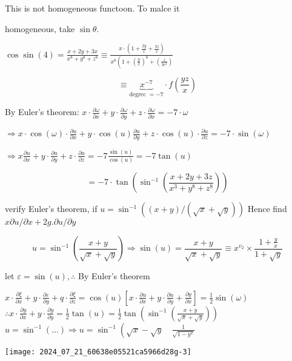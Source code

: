 \documentclass[12pt, a4paper]{article}
\begin{document}
This is not homogeneous functoon. To malce it

homogeneous, take $\sin \theta$.

$\cos \sin (4)=\frac{x+2 y+3 x}{x^{8}+y^{8}+z^{8}} \equiv \frac{x \cdot\left(1+\frac{2 y}{x}+\frac{3 z}{x}\right)}{x^{8}\left(1+\left(\frac{y}{x}\right)^{8}+\left(\frac{z}{3 c^{2}}\right)\right.}$

$$
\equiv \underbrace{x^{-7}}_{\text {degrec }=-7} \cdot f\left(\frac{y z}{x}\right)
$$

By Euler's theorem: $x \cdot \frac{\partial \omega}{\partial x}+y \cdot \frac{\partial \omega}{\partial y}+z \cdot \frac{\partial \omega}{\partial x}=-7 \cdot \omega$

$\Rightarrow x \cdot \cos (\omega) \cdot \frac{\partial u}{\partial x}+y \cdot \cos (u) \frac{\partial u}{\partial y}+z \cdot \cos (u) \cdot \frac{\partial u}{\partial z}=-7 \cdot \sin (\omega)$

$\Rightarrow x \frac{\partial u}{\partial x}+y \cdot \frac{\partial u}{\partial y}+z \cdot \frac{\partial u}{\partial z}=-7 \frac{\sin (u)}{\cos (u)}=-7 \tan (u)$

$$
=-7 \cdot \tan \left(\sin ^{-1}\left(\frac{x+2 y+3 z}{x^{3}+y^{8}+z^{8}}\right)\right)
$$

verify Euler's theorem, if $u=\sin ^{-1}((x+y) /(\sqrt{x}+\sqrt{y}))$ Hence find $x \partial u / \partial x+2 g . \partial u / \partial y$

$$
u=\sin ^{-1}\left(\frac{x+y}{\sqrt{x}+\sqrt{y}}\right) \Rightarrow \sin (u)=\frac{x+y}{\sqrt{x}+\sqrt{y}} \equiv x^{v_{2}} \times \frac{1+\frac{y}{x}}{1+\sqrt{y}}
$$

let $\varepsilon=\sin (u), \therefore$ By Euler's theorem

$x \cdot \frac{\partial \xi}{\partial x}+y \cdot \frac{\partial \varepsilon}{\partial y}+q \cdot \frac{\partial \xi}{\partial z}=\cos (u)\left[x \cdot \frac{\partial u}{\partial x}+y \cdot \frac{\partial u}{\partial y}+\frac{\partial y}{\partial x}\right]=\frac{1}{2} \sin (\omega)$ $\therefore x \cdot \frac{\partial y}{\partial x}+y \cdot \frac{\partial y}{\partial y}=\frac{1}{2} \tan (u)=\frac{1}{2} \tan \left(\sin ^{-1}\left(\frac{x+y}{\sqrt{x}+\sqrt{y}}\right)\right)$ $u=\sin ^{-1}(\ldots) \Longrightarrow u=\sin ^{-1}\left(\sqrt{x}-\sqrt{y} \quad \frac{1}{\sqrt{1-y^{2}}}\right.$

\begin{center}
\texttt{[image: 2024\_07\_21\_60638e05521ca5966d28g-3]}
\end{center}
\end{document}
